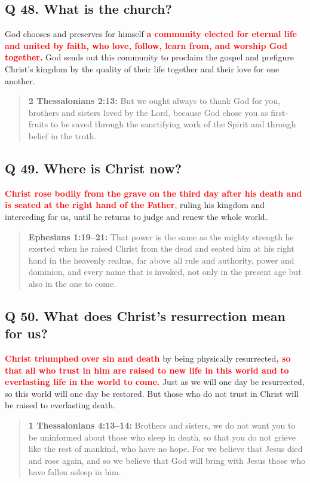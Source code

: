 \documentclass[]{memoir}
\newcommand\Children[1]{\textbf{\textcolor{red}{#1}}}
\newcommand\Quote[2]{\begin{quote}{\textbf{#1:}{ #2}}\end{quote}}
\begin{document}
\subsection{Q 48. What is the church?}
God chooses and preserves for himself \Children{a community elected for eternal life and united by faith, who love, follow, learn from, and worship God together.} God sends out this community to proclaim the gospel and prefigure Christ's kingdom by the quality of their life together and their love for one another.

\Quote{2 Thessalonians 2:13}{But we ought always to thank God for you, brothers and sisters loved by the Lord, because God chose you as first-fruits to be saved through the sanctifying work of the Spirit and through belief in the truth.}

\subsection{Q 49. Where is Christ now?}
\Children{Christ rose bodily from the grave on the third day after his death and is seated at the right hand of the Father}, ruling his kingdom and interceding for us, until he returns to judge and renew the whole world\Children{.}

\Quote{Ephesians 1:19--21}{That power is the same as the mighty strength he exerted when he raised Christ from the dead and seated him at his right hand in the heavenly realms, far above all rule and authority, power and dominion, and every name that is invoked, not only in the present age but also in the one to come.}

\subsection{Q 50. What does Christ's resurrection mean for us?}
\Children{Christ triumphed over sin and death} by being physically resurrected\Children{, so that all who trust in him are raised to new life in this world and to everlasting life in the world to come.} Just as we will one day be resurrected, so this world will one day be restored. But those who do not trust in Christ will be raised to everlasting death.

\Quote{1 Thessalonians 4:13--14}{Brothers and sisters, we do not want you to be uninformed about those who sleep in death, so that you do not grieve like the rest of mankind, who have no hope. For we believe that Jesus died and rose again, and so we believe that God will bring with Jesus those who have fallen asleep in him.}
\end{document}
